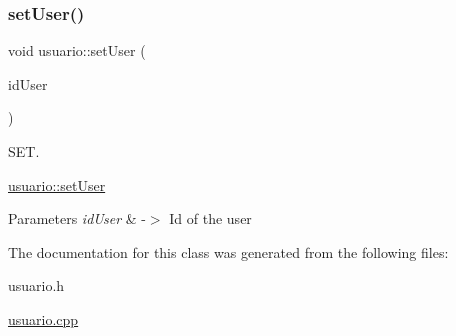 \subsubsection{\texorpdfstring{set\+User()}{setUser()}}
{\footnotesize\ttfamily void usuario\+::set\+User (\begin{DoxyParamCaption}\item[{Q\+String}]{id\+User }\end{DoxyParamCaption})}



S\+ET. 

\mbox{\hyperlink{classusuario_adea7be5d8eb2f89a54c38d9a0a7cf847}{usuario\+::set\+User}} 
\begin{DoxyParams}{Parameters}
{\em id\+User} & -\/$>$ Id of the user \\
\hline
\end{DoxyParams}


The documentation for this class was generated from the following files\+:\begin{DoxyCompactItemize}
\item 
usuario.\+h\item 
\mbox{\hyperlink{usuario_8cpp}{usuario.\+cpp}}\end{DoxyCompactItemize}
